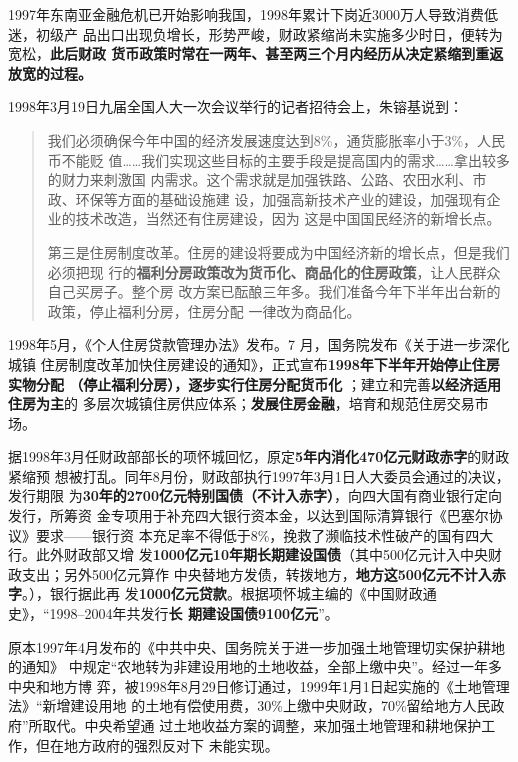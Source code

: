 1997年东南亚金融危机已开始影响我国，1998年累计下岗近3000万人导致消费低迷，初级产
品出口出现负增长，形势严峻，财政紧缩尚未实施多少时日，便转为宽松，\textbf{此后财政
  货币政策时常在一两年、甚至两三个月内经历从决定紧缩到重返放宽的过程。}


1998年3月19日九届全国人大一次会议举行的记者招待会上，朱镕基说到：
\begin{quotation}
  我们必须确保今年中国的经济发展速度达到8\%，通货膨胀率小于3\%，人民币不能贬
  值……我们实现这些目标的主要手段是提高国内的需求……拿出较多的财力来刺激国
  内需求。这个需求就是加强铁路、公路、农田水利、市政、环保等方面的基础设施建
  设，加强高新技术产业的建设，加强现有企业的技术改造，当然还有住房建设，因为
  这是中国国民经济的新增长点。


  第三是住房制度改革。住房的建设将要成为中国经济新的增长点，但是我们必须把现
  行的\textbf{福利分房政策改为货币化、商品化的住房政策}，让人民群众自己买房子。整个房
  改方案已酝酿三年多。我们准备今年下半年出台新的政策，停止福利分房，住房分配
  一律改为商品化。
\end{quotation}

1998年5月，《个人住房贷款管理办法》发布。7 月，国务院发布《关于进一步深化城镇
住房制度改革加快住房建设的通知》，正式宣布\textbf{1998年下半年开始停止住房实物分配
  （停止福利分房），逐步实行住房分配货币化} ；建立和完善\textbf{以经济适用住房为主}的
多层次城镇住房供应体系；\textbf{发展住房金融}，培育和规范住房交易市场。

据1998年3月任财政部部长的项怀城回忆，原定\textbf{5年内消化470亿元财政赤字}的财政紧缩预
想被打乱。同年8月份，财政部执行1997年3月1日人大委员会通过的决议，发行期限
为\textbf{30年的2700亿元特别国债（不计入赤字）}，向四大国有商业银行定向发行，所筹资
金专项用于补充四大银行资本金，以达到国际清算银行《巴塞尔协议》要求——银行资
本充足率不得低于8\%，挽救了濒临技术性破产的国有四大行。此外财政部又增
发\textbf{1000亿元10年期长期建设国债}（其中500亿元计入中央财政支出；另外500亿元算作
中央替地方发债，转拨地方，\textbf{地方这500亿元不计入赤字}。），银行据此再
发\textbf{1000亿元贷款}。根据项怀城主编的《中国财政通史》，“1998--2004年共发行\textbf{长
  期建设国债9100亿元}”。


原本1997年4月发布的《中共中央、国务院关于进一步加强土地管理切实保护耕地的通知》
中规定“农地转为非建设用地的土地收益，全部上缴中央”。经过一年多中央和地方博
弈，被1998年8月29日修订通过，1999年1月1日起实施的《土地管理法》“新增建设用地
的土地有偿使用费，30\%上缴中央财政，70\%留给地方人民政府”所取代。中央希望通
过土地收益方案的调整，来加强土地管理和耕地保护工作，但在地方政府的强烈反对下
未能实现。\cite{ZDJJ200804009}

